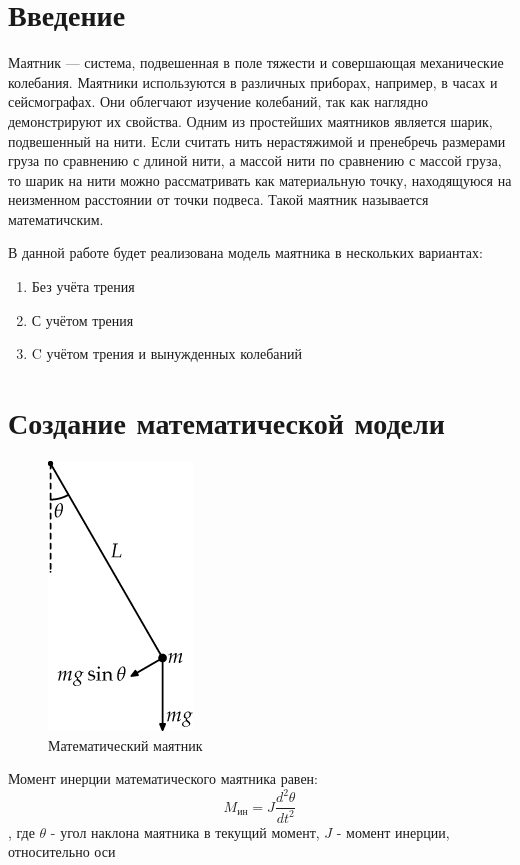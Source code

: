 \documentclass[a4paper, 14pt]{extarticle}
\begin{document}
	\pagebreak	

	\section{Введение}
		Маятник — система, подвешенная в поле тяжести и совершающая механические колебания. Маятники используются в различных приборах, например, в часах и сейсмографах. Они облегчают изучение колебаний, так как наглядно демонстрируют их свойства. Одним из простейших маятников является шарик, подвешенный на нити. Если считать нить нерастяжимой и пренебречь размерами груза по сравнению с длиной нити, а массой нити по сравнению с массой груза, то шарик на нити можно рассматривать как материальную точку, находящуюся на неизменном расстоянии от точки подвеса. Такой маятник называется математичским.
		
		В данной работе будет реализована модель маятника в нескольких вариантах:
		\begin{enumerate}
			\item Без учёта трения
			\item С учётом трения
			\item C учётом трения и вынужденных колебаний
		\end{enumerate}
		
		
		
	\section{Создание математической модели}
		\begin{figure}[H]
			\centering
			\includegraphics[]{fig1.png}
			\caption[.] {Математический маятник}
		\end{figure}
		
		Момент инерции математического маятника равен:
		\[ M_{\text{ин}} = J\dfrac{d^2\theta}{dt^2} \tag{1} \label{eq:1} \],
		где $\theta$ - угол наклона маятника в текущий момент, $J$ - момент инерции, относительно оси
		
\end{document}
